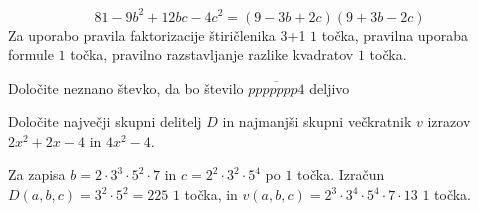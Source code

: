 \documentclass[addpoints]{exam}
\begin{document}
\begin{questions}
\begin{parts}
        \begin{solution}[1cm]
            $$81-9b^2+12bc-4c^2=(9-3b+2c)(9+3b-2c)$$
            Za uporabo pravila faktorizacije štiričlenika 3+1 $1$ točka, pravilna uporaba formule $1$ točka, pravilno razstavljanje razlike kvadratov $1$ točka.
        \end{solution}


    \end{parts}


    \newpage

    \question
    Določite neznano števko, da bo število $\overline{ppppppp4}$ deljivo




    \question[4]
    Določite največji skupni delitelj $D$ in najmanjši skupni večkratnik $v$ izrazov $2x^2+2x-4$ in $4x^2-4$.

    \begin{solution}[6cm]
        Za zapisa $b=2\cdot 3^3\cdot 5^2\cdot 7$ in $c=2^2\cdot 3^2\cdot 5^4$ po $1$ točka. 
        Izračun $D(a,b,c)=3^2\cdot 5^2=225$ $1$ točka, in $v(a,b,c)=2^3\cdot 3^4\cdot 5^4\cdot 7\cdot 13$ $1$ točka.
    \end{solution}
    

\end{questions}
\end{document}
